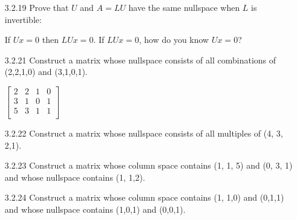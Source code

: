 \documentclass[10pt,twoside,reqno]{article}
\begin{document}
\begin{enumerate}
\item[3.2.19] Prove that $U$ and $A = LU$ have the same nullspace when $L$ is invertible: \\
\begin{center}
If $Ux = 0$ then $LUx = 0$. If $LUx = 0$, how do you know $Ux = 0$? \\
\end{center}
\vspace{3mm}


\vspace{3mm}
\item[3.2.21] Construct a matrix whose nullspace consists of all combinations of (2,2,1,0) and (3,1,0,1).\\
\vspace{3mm}
\begin{center}
$
$$
\begin{bmatrix}
2&2&1&0\\
3&1&0&1\\
5&3&1&1\\
\end{bmatrix}
$$
$\\
\end{center}
\vspace{3mm}
\item[3.2.22] Construct a matrix whose nullspace consists of all multiples of (4, 3, 2,1).\\
\vspace{3mm}



\item[3.2.23] Construct a matrix whose column space contains (1, 1, 5) and (0, 3, 1) and whose nullspace contains (1, 1,2). \\
\vspace{3mm}



\item[3.2.24] Construct a matrix whose column space contains (1, 1,0) and (0,1,1) and whose nullspace contains (1,0,1) and (0,0,1). \\
\vspace{3mm}




\end{enumerate}
\end{document}

